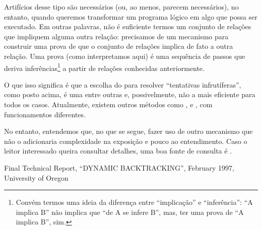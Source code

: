 Artifícios desse tipo são necessários (ou, ao menos, parecem
necessários), no entanto, quando queremos transformar um programa
lógico em algo que possa ser executado. Em outras palavras, não é
suficiente termos um conjunto de relações que impliquem alguma outra
relação: precisamos de um mecanismo para construir uma prova de que o
conjunto de relações implica de fato a outra relação.  Uma prova (como
interpretamos aqui) é uma sequência de passos que deriva
inferências\footnote{Convém termos uma ideia da diferença entre
  ``implicação'' e ``inferência'': ``A implica B'' não implica que
  ``de A se infere B'', mas, ter uma prova de ``A implica B'', sim.} a
partir de relações conhecidas anteriormente.

O que isso significa é que a escolha do  para
resolver ``tentativas infrutíferas'', como posto acima, é uma entre
outras e, possivelmente, não a mais eficiente para todos os
casos. Atualmente, existem outros métodos como ,  e
, com funcionamentos diferentes.

No entanto, entendemos que, no que se segue, fazer uso de outro
mecanismo que não o  adicionaria complexidade
na exposição e pouco  ao entendimento. Caso o leitor
interessado queira consultar detalhes, uma boa fonte de consulta é
\cite{dyn}.


\begin{thebibliography}{2}

 Final Technical Report, ``DYNAMIC BACKTRACKING'',
  February 1997, University of Oregon

\end{thebibliography}

%
